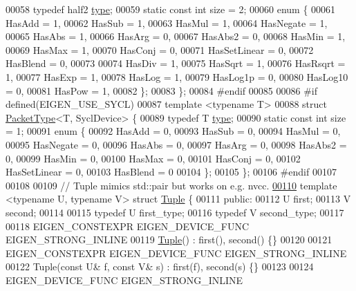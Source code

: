 \begin{DoxyCode}
00058   \textcolor{keyword}{typedef} half2 \hyperlink{group___sparse_core___module}{type};
00059   \textcolor{keyword}{static} \textcolor{keyword}{const} \textcolor{keywordtype}{int} size = 2;
00060   \textcolor{keyword}{enum} \{
00061     HasAdd    = 1,
00062     HasSub    = 1,
00063     HasMul    = 1,
00064     HasNegate = 1,
00065     HasAbs    = 1,
00066     HasArg    = 0,
00067     HasAbs2   = 0,
00068     HasMin    = 1,
00069     HasMax    = 1,
00070     HasConj   = 0,
00071     HasSetLinear = 0,
00072     HasBlend  = 0,
00073 
00074     HasDiv    = 1,
00075     HasSqrt   = 1,
00076     HasRsqrt  = 1,
00077     HasExp    = 1,
00078     HasLog    = 1,
00079     HasLog1p  = 0,
00080     HasLog10  = 0,
00081     HasPow    = 1,
00082   \};
00083 \};
00084 \textcolor{preprocessor}{#endif}
00085 
00086 \textcolor{preprocessor}{#if defined(EIGEN\_USE\_SYCL)}
00087 \textcolor{keyword}{template} <\textcolor{keyword}{typename} T>
00088   \textcolor{keyword}{struct }\hyperlink{struct_eigen_1_1_packet_type}{PacketType}<T, SyclDevice> \{
00089   \textcolor{keyword}{typedef} T \hyperlink{group___sparse_core___module}{type};
00090   \textcolor{keyword}{static} \textcolor{keyword}{const} \textcolor{keywordtype}{int} size = 1;
00091   \textcolor{keyword}{enum} \{
00092     HasAdd    = 0,
00093     HasSub    = 0,
00094     HasMul    = 0,
00095     HasNegate = 0,
00096     HasAbs    = 0,
00097     HasArg    = 0,
00098     HasAbs2   = 0,
00099     HasMin    = 0,
00100     HasMax    = 0,
00101     HasConj   = 0,
00102     HasSetLinear = 0,
00103     HasBlend  = 0
00104   \};
00105 \};
00106 \textcolor{preprocessor}{#endif}
00107 
00108 
00109 \textcolor{comment}{// Tuple mimics std::pair but works on e.g. nvcc.}
\hyperlink{struct_eigen_1_1_tuple}{00110} \textcolor{keyword}{template} <\textcolor{keyword}{typename} U, \textcolor{keyword}{typename} V> \textcolor{keyword}{struct }\hyperlink{struct_eigen_1_1_tuple}{Tuple} \{
00111  \textcolor{keyword}{public}:
00112   U first;
00113   V second;
00114 
00115   \textcolor{keyword}{typedef} U first\_type;
00116   \textcolor{keyword}{typedef} V second\_type;
00117 
00118   EIGEN\_CONSTEXPR EIGEN\_DEVICE\_FUNC EIGEN\_STRONG\_INLINE
00119   \hyperlink{struct_eigen_1_1_tuple}{Tuple}() : first(), second() \{\}
00120 
00121   EIGEN\_CONSTEXPR EIGEN\_DEVICE\_FUNC EIGEN\_STRONG\_INLINE
00122   Tuple(\textcolor{keyword}{const} U& f, \textcolor{keyword}{const} V& s) : first(f), second(s) \{\}
00123 
00124   EIGEN\_DEVICE\_FUNC EIGEN\_STRONG\_INLINE

\end{DoxyCode}

